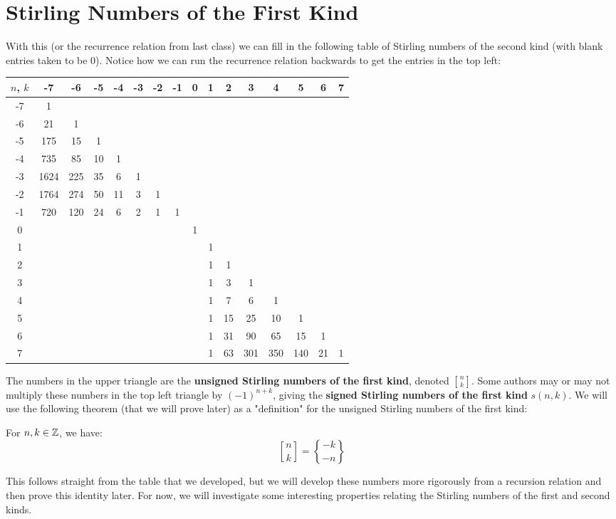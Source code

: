 \documentclass[11pt,twosided]{article}
\newcommand{\stirlingone}[2]{\genfrac[]{0pt}{1}{#1}{#2}}
\newcommand{\stiri}[2]{\stirlingone{#1}{#2}}
\newcommand{\dstirlingone}[2]{\genfrac[]{0pt}{0}{#1}{#2}}
\newcommand{\dstiri}[2]{\dstirlingone{#1}{#2}}
\newcommand{\dstirlingtwo}[2]{\genfrac\{\}{0pt}{0}{#1}{#2}}
\newcommand{\dstirii}[2]{\dstirlingtwo{#1}{#2}}
\begin{document}
\section{Stirling Numbers of the First Kind}
With this (or the recurrence relation from last class) we can fill in the following table of Stirling numbers of the second kind (with blank entries taken to be 0). Notice how we can run the recurrence relation backwards to get the entries in the top left: 
\begin{center}
\begin{tabular}{c | c c c c c c c c c c c c c c c }
$n$, $k$& -7 & -6 & -5 & -4 & -3 & -2 & -1 & 0 & 1 & 2 & 3 & 4 & 5 & 6 & 7 \\ \hline
-7 & 1 & & & & & & & & & & & & &  & \\ 
-6 & 21 & 1 & & & & & & & & & & & &  & \\
-5 & 175 & 15 & 1 & & & & & & & & & &  & & \\
-4 & 735 & 85 & 10 & 1 & & & & & & & & & & &  \\
-3 & 1624 & 225 & 35 & 6 & 1 & & & & & & & & & & \\
-2 & 1764 & 274 & 50 & 11 & 3 & 1 & & & & & & & & &  \\
-1 & 720 & 120 & 24 & 6 & 2 & 1 & 1 & & & & & & & &  \\
0 & & & & & & & & 1 & & & & & & &  \\ 
1 & & & & & & & & & 1 & & & & & &  \\
2 & & & & & & & & & 1 & 1 & & & & &  \\
3 & & & & & & & & & 1 & 3 & 1 & & & &  \\
4 & & & & & & & & & 1 & 7 & 6 & 1 & & & \\
5 & & & & & & & & & 1 & 15 & 25 & 10 & 1 & &\\
6 & & & & & & & & & 1 & 31 & 90 & 65 & 15 & 1 & \\
7 & & & & & & & & & 1 & 63 & 301 & 350 & 140 & 21 & 1 \\
\end{tabular}
\end{center}

The numbers in the upper triangle are the \textbf{unsigned Stirling numbers of the first kind}, denoted $\stiri{n}{k}$. Some authors may or may not multiply these numbers in the top left triangle by $(-1)^{n+k}$, giving the \textbf{signed Stirling numbers of the first kind} $s(n, k)$. We will use the following theorem (that we will prove later) as a "definition" for the unsigned Stirling numbers of the first kind:
\begin{theorem}
For $n, k \in \mathbb{Z}$, we have:
$$\dstiri{n}{k} = \dstirii{-k}{-n} $$
\end{theorem}
This follows straight from the table that we developed, but we will develop these numbers more rigorously from a recursion relation and then prove this identity later. For now, we will investigate some interesting properties relating the Stirling numbers of the first and second kinds. 
\end{document}
